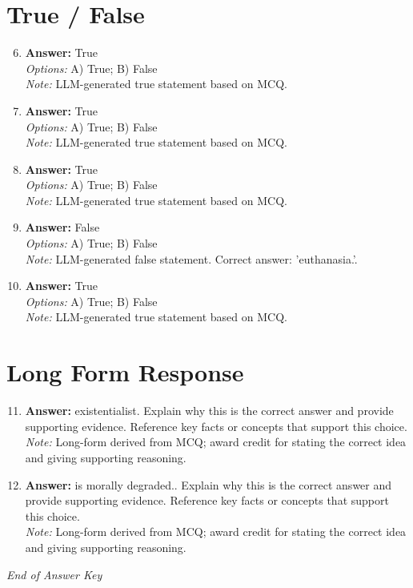 \documentclass[12pt]{article}
\begin{document}
\section*{True / False}
\begin{enumerate}[label=\arabic*.]
\setcounter{enumi}{5}
\item \textbf{Answer:} True
\\ \textit{Options:} A) True; B) False
\\ \textit{Note:} LLM-generated true statement based on MCQ.
\item \textbf{Answer:} True
\\ \textit{Options:} A) True; B) False
\\ \textit{Note:} LLM-generated true statement based on MCQ.
\item \textbf{Answer:} True
\\ \textit{Options:} A) True; B) False
\\ \textit{Note:} LLM-generated true statement based on MCQ.
\item \textbf{Answer:} False
\\ \textit{Options:} A) True; B) False
\\ \textit{Note:} LLM-generated false statement. Correct answer: 'euthanasia.'.
\item \textbf{Answer:} True
\\ \textit{Options:} A) True; B) False
\\ \textit{Note:} LLM-generated true statement based on MCQ.
\end{enumerate}

\section*{Long Form Response}
\begin{enumerate}[label=\arabic*.]
\setcounter{enumi}{10}
\item \textbf{Answer:} existentialist. Explain why this is the correct answer and provide supporting evidence. Reference key facts or concepts that support this choice.
\\ \textit{Note:} Long-form derived from MCQ; award credit for stating the correct idea and giving supporting reasoning.
\item \textbf{Answer:} is morally degraded.. Explain why this is the correct answer and provide supporting evidence. Reference key facts or concepts that support this choice.
\\ \textit{Note:} Long-form derived from MCQ; award credit for stating the correct idea and giving supporting reasoning.
\end{enumerate}

\vfill
\noindent\textit{End of Answer Key}
\end{document}
